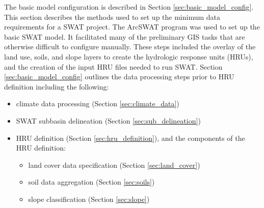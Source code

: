 The basic model configuration is described in Section \ref{sec:basic_model_config}. 
This section describes the methods used to set up the minimum data requirements for a SWAT project. 
The ArcSWAT program was used to set up the basic SWAT model. It facilitated many of the preliminary GIS tasks that are otherwise difficult to configure manually.
These steps included the overlay of the land use, soils, and slope layers to create the hydrologic response units (HRUs), and the creation of the input HRU files needed to run SWAT. Section \ref{sec:basic_model_config} outlines the data processing steps prior to HRU definition including the following:

\begin{itemize}
\item climate data processing (Section \ref{sec:climate_data})
\item SWAT subbasin delineation (Section \ref{sec:sub_delineation})
\item HRU definition (Section \ref{sec:hru_definition}), and the components of the HRU definition:
	\begin{itemize}
		\item land cover data specification (Section \ref{sec:land_cover})
		\item soil data aggregation (Section \ref{sec:soils})
		\item slope classification (Section \ref{sec:slope})
	\end{itemize}
\end{itemize}

